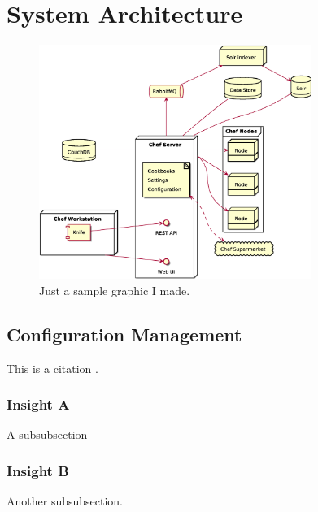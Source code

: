 \section{System Architecture}

\begin{figure}
\includegraphics[height=3in]{assets/chef_architecture}
\caption{Just a sample graphic I made.}
\end{figure}


\subsection{Configuration Management}

This is a citation \cite{Lamport:LaTeX}.

\subsubsection{Insight A}

A subsubsection

\subsubsection{Insight B}
Another subsubsection.